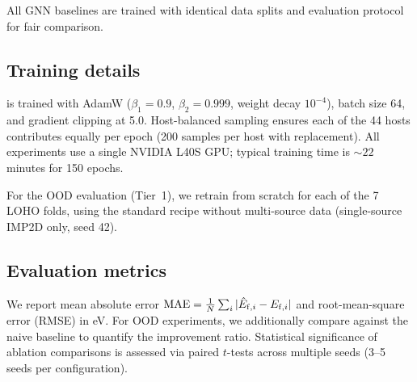 All GNN baselines are trained with identical data splits and evaluation
protocol for fair comparison.

\subsection{Training details}

\dart{} is trained with AdamW ($\beta_1 = 0.9$, $\beta_2 = 0.999$,
weight decay $10^{-4}$), batch size 64, and gradient clipping at 5.0.
Host-balanced sampling ensures each of the 44 hosts contributes equally per
epoch (200 samples per host with replacement).
All experiments use a single NVIDIA L40S GPU; typical training time is
${\sim}22$ minutes for 150 epochs.

For the OOD evaluation (Tier~1), we retrain \dart{} from scratch for each of
the 7 LOHO folds, using the standard recipe without multi-source data
(single-source IMP2D only, seed 42).

\subsection{Evaluation metrics}

We report mean absolute error
$\mathrm{MAE} = \frac{1}{N}\sum_i |{\hat{E}}_{\mathrm{f},i} - E_{\mathrm{f},i}|$
and root-mean-square error (RMSE) in eV.
For OOD experiments, we additionally compare against the naive baseline to
quantify the improvement ratio.
Statistical significance of ablation comparisons is assessed via paired
$t$-tests across multiple seeds (3--5 seeds per configuration).

